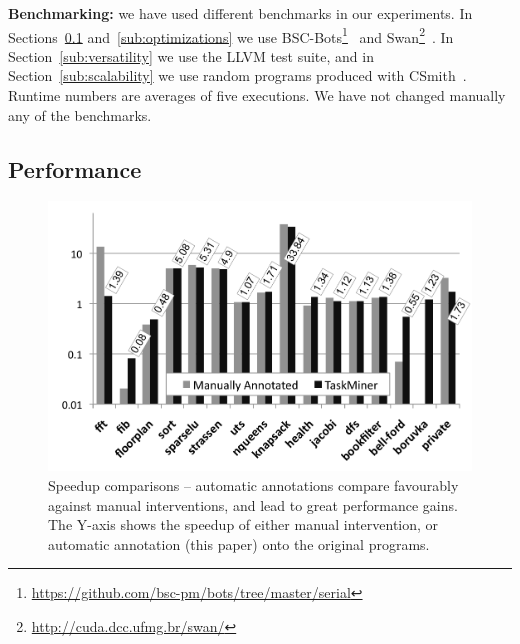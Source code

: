 \documentclass[sigplan,10pt,review,anonymous]{acmart}
\begin{document}
\noindent
\textbf{Benchmarking:}
we have used different benchmarks in our experiments.
In Sections~\ref{sub:performance} and~\ref{sub:optimizations} we use
\textsf{BSC-Bots}\footnote{\url{https://github.com/bsc-pm/bots/tree/master/serial}}~\cite{Duran09} and
\textsf{Swan}\footnote{\url{http://cuda.dcc.ufmg.br/swan/}}~\cite{Moreira17}.
In Section~\ref{sub:versatility} we use the LLVM test suite, and in
Section~\ref{sub:scalability} we use random programs produced with
\textsf{CSmith}~\cite{Yang11}.
Runtime numbers are averages of five executions.
We have not changed manually any of the benchmarks.

\subsection{Performance}
\label{sub:performance}

\begin{figure}[h]
\begin{center}
\includegraphics[width=1\columnwidth]{images/TM_Performance}
\caption{Speedup comparisons -- automatic annotations compare favourably against
manual interventions, and lead to great performance gains.
The Y-axis shows the speedup of either manual intervention, or automatic
annotation (this paper) onto the original programs.}
\label{fig:TM_Performance}
\end{center}
\end{figure}
\end{document}
